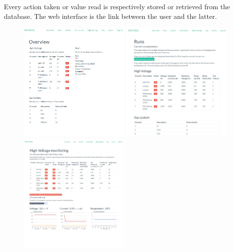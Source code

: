       Every action taken or value read is respectively stored or retrieved from the database. The web interface is the link between the user and the latter.

      \begin{figure}[h!]
        \centering
        \includegraphics[width=0.49\textwidth]{img/III-1-arch/app-home.png}
        \includegraphics[width=0.49\textwidth]{img/III-1-arch/app-runs.png} \\
        \includegraphics[width=0.49\textwidth]{img/III-1-arch/app-hv.png}

\end{figure}
